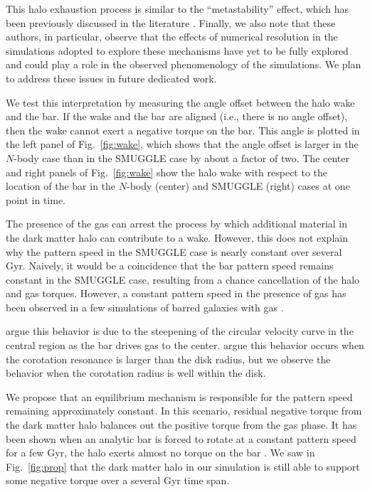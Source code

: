 \documentclass[twocolumn,linenumbers]{aastex631}
\newcommand{\Nbody}{$N$-body}
\newcommand{\SMUGGLE}{SMUGGLE}
\begin{document}
This halo exhaustion process is similar to the ``metastability'' effect, which
has been previously discussed in the literature \citep{2003MNRAS.345..406V,
2006ApJ...639..868S}. Finally, we also note that these authors, in particular,
observe that the effects of numerical resolution in the simulations adopted to
explore these mechanisms have yet to be fully explored and could play a role in
the observed phenomenology of the simulations. We plan to address these issues
in future dedicated work.

We test this interpretation by measuring the angle offset between the halo
wake and the bar. If the wake and the bar are aligned (i.e., there is no angle
offset), then the wake cannot exert a negative torque on the bar. This angle
is plotted in the left panel of Fig.~\ref{fig:wake}, which shows that the
angle offset is larger in the \Nbody{} case than in the \SMUGGLE{} case by about a
factor of two. The center and right panels of Fig.~\ref{fig:wake} show the halo
wake with respect to the location of the bar in the \Nbody{} (center) and \SMUGGLE{}
(right) cases at one point in time.

The presence of the gas can arrest the process by which additional material in
the dark matter halo can contribute to a wake. However, this does not explain
why the pattern speed in the \SMUGGLE{} case is nearly constant over several
Gyr. Naively, it would be a coincidence that the bar pattern speed remains
constant in the \SMUGGLE{} case, resulting from a chance cancellation of the
halo and gas torques. However, a constant pattern speed in the presence of gas
has been observed in a few simulations of barred galaxies with gas
\citep{1993AA...268...65F, 2007ApJ...666..189B, 2009ApJ...707..218V,
2010ApJ...719.1470V, 2014MNRAS.438L..81A}.

\citet{1993AA...268...65F} argue this behavior is due to the steepening of the
circular velocity curve in the central region as the bar drives gas to the
center. \citet{2009ApJ...707..218V} argue this behavior occurs when the
corotation resonance is larger than the disk radius, but we observe the behavior
when the corotation radius is well within the disk.


We propose that an equilibrium mechanism is responsible for the pattern speed
remaining approximately constant. In this scenario, residual negative torque
from the dark matter halo balances out the positive torque from the gas phase.
It has been shown when an analytic bar is forced to rotate at a constant pattern
speed for a few Gyr, the halo exerts almost no torque on the bar
\citep{2022MNRAS.513..768C}. We saw in Fig.~\ref{fig:prop} that the dark matter
halo in our simulation is still able to support some negative torque over a
several Gyr time span.
\end{document}
